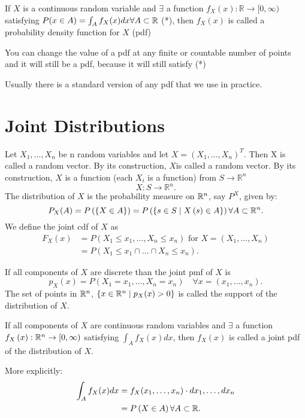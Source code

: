 
If $X$ is a continuous random variable and $\exists $ a function $f_{X}(x) : \mathbb{R} \to [0,\infty)$ satisfying $P(x \in A) = \int_{A} f_{X} (x) dx   \forall   A \subset \mathbb{R}$ (*), then $f_{X}(x)$ is called a probability density function for $X$ (pdf) 

\begin{remark}
	You can change the value of a pdf at any finite or countable number of points and it will still be a pdf, because it will still satisfy (*)
\end{remark}

Usually there is a standard version of any pdf that we use in practice. 

\section{Joint Distributions}

Let $X_{1}, \ldots , X_{n}$ be n random variables and let $X = (X_{1}, \ldots , X_{n})^{T}$. Then X is called a random vector. By its construction, $X$is called a random vector. By its construction, $X$ is a function (each $X_{i}$ is a function) from $S \to \mathbb{R}^{n}$ \[
X : S \to \mathbb{R}^{n}
.\] 
The distribution of $X$ is the probability measure on $\mathbb{R}^{n}$, say $P^{X}$, given by: \[
	P_{X} (A) = P\left( \left\{ X \in  A  \right\}  \right)  = P\left( \left\{ s \in S  \mid X \left( s \right) \in  A \right\}  \right) \forall A \subset \mathbb{R}^{n}
.\] 
We define the joint cdf of $X$ as 
\begin{align*}
	F_{X}\left( x \right) &= P\left( X_{1} \le x_{1}, \ldots, X_{n}\le x_{n} \right) \text{ for } X = (X_{1}, \ldots , X_{n}) \\
	&= P\left(  X_{1} \le x_{1} \cap  \ldots \cap  X_{n}\le x_{n} \right) 
.\end{align*}

If all components of $X$ are discrete than the joint pmf of $X$ is \[
	p_{X}(x) = P(X_{1} = x_{1}, \ldots, X_{n} = x_{n}) \quad \forall  x = \left( x_{1}, \ldots , x_{n} \right) 
.\] 
The set of points in $\mathbb{R}^{n}$, $\left\{ x \in  \mathbb{R}^{n} \mid p_{X}(x) > 0 \right\} $ is called the support of the distribution of $X$. 

If all components of $X$ are continuous random variables and $\exists $ a function $f_{X}\left( x \right)  : \mathbb{R}^{n} \to [0, \infty)$ satisfying $\int_{A} f_{X}(x) dx$, then $f_{X}(x)$ is called a joint pdf of the distribution of $X$. 

More explicitly: 
\begin{align*}
	\int_{A}^{} f_{X} (x) dx &= f_{X} (x_{1}, \ldots, x_{n}) \cdot dx_{1}, \ldots , dx_{n}\\
				 &= P\left( X \in A \right)  \forall A \subset \mathbb{R} 
.\end{align*}
